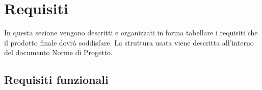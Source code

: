
\section{Requisiti}
In questa sezione vengono descritti e organizzati in forma tabellare i requisiti che il prodotto finale dovrà soddisfare. La struttura usata viene descritta all'interno del documento Norme di Progetto.


\subsection{Requisiti funzionali}

